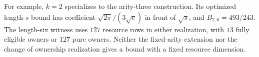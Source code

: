 For example, $k=2$ specializes to the arity-three construction.  Its optimized
length-$s$ bound has coefficient
$\sqrt{2\pi}/(3\sqrt e)$ in front of $\sqrt s$, and $B_{2,6}=493/243$.
The length-six witness uses $127$ resource rows in either realization,
with $13$ fully eligible owners or $127$ pure owners.  Neither the
fixed-arity extension nor the change of ownership realization gives a
bound with a fixed resource dimension.
